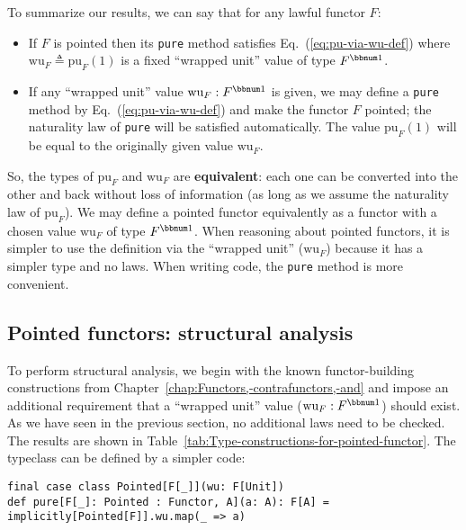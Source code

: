 To summarize our results, we can say that for any lawful functor $F$:
\begin{itemize}
\item If $F$ is pointed then its \lstinline!pure! method satisfies Eq.~(\ref{eq:pu-via-wu-def})
where $\text{wu}_{F}\triangleq\text{pu}_{F}(1)$ is a fixed \textsf{``}wrapped
unit\textsf{''} value of type $F^{\bbnum 1}$.
\item If any \textsf{``}wrapped unit\textsf{''} value $\text{wu}_{F}:F^{\bbnum 1}$ is given,
we may define a \lstinline!pure! method by Eq.~(\ref{eq:pu-via-wu-def})
and make the functor $F$ pointed; the naturality law of \lstinline!pure!
will be satisfied automatically. The value $\text{pu}_{F}(1)$ will
be equal to the originally given value $\text{wu}_{F}$.
\end{itemize}
So, the types of $\text{pu}_{F}$ and $\text{wu}_{F}$ are\textbf{
equivalent}: each one can be converted into
the other and back without loss of information (as long as we assume
the naturality law of $\text{pu}_{F}$). We may define a pointed functor
equivalently as a functor with a chosen value $\text{wu}_{F}$ of
type $F^{\bbnum 1}$. When reasoning about pointed functors, it is
simpler to use the definition via the \textsf{``}wrapped unit\textsf{''} ($\text{wu}_{F}$)
because it has a simpler type and no laws. When writing code, the
\lstinline!pure! method is more convenient.

\subsection{Pointed functors: structural analysis\label{subsec:Pointed-functors:-structural-analysis}}

To perform structural analysis, we begin with the known functor-building
constructions from Chapter~\ref{chap:Functors,-contrafunctors,-and}
and impose an additional requirement that a \textsf{``}wrapped unit\textsf{''} value
($\text{wu}_{F}:F^{\bbnum 1}$) should exist. As we have seen in the
previous section, no additional laws need to be checked. The results
are shown in Table~\ref{tab:Type-constructions-for-pointed-functor}.
The typeclass can be defined by a simpler code:
\begin{lstlisting}
final case class Pointed[F[_]](wu: F[Unit])
def pure[F[_]: Pointed : Functor, A](a: A): F[A] = implicitly[Pointed[F]].wu.map(_ => a)
\end{lstlisting}

